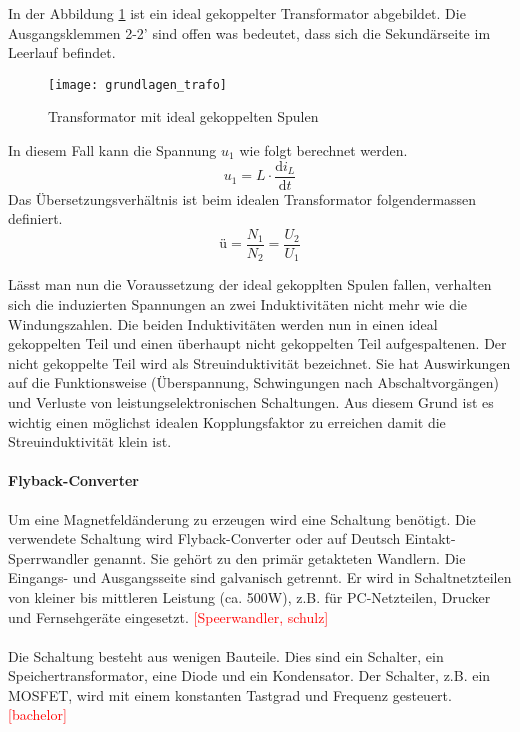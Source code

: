 In der Abbildung \ref{fig:trafo} ist ein ideal gekoppelter Transformator abgebildet. Die Ausgangsklemmen 2-2' sind offen was bedeutet, dass sich die Sekundärseite im Leerlauf befindet. 
\begin{figure}[H]
	\centering
	\texttt{[image: grundlagen\_trafo]}
	\caption{Transformator mit ideal gekoppelten Spulen}\label{fig:trafo}
\end{figure}
In diesem Fall kann die Spannung $ u_{1} $ wie folgt berechnet werden.
\begin{equation}\label{eq:induktionsspannung}
u_{1}=L \cdot \frac{\mathrm{d} i_{L}}{\mathrm{d} t}
\end{equation}
Das Übersetzungsverhältnis ist beim idealen Transformator folgendermassen definiert.
\begin{equation}\label{eq:übertragung}
ü= \frac{N_{1}}{N_{2}} = \frac{U_{2}}{U_{1}}
\end{equation}

Lässt man nun die Voraussetzung der ideal gekopplten Spulen fallen, verhalten sich die induzierten Spannungen an zwei Induktivitäten nicht mehr wie die Windungszahlen. Die beiden Induktivitäten werden nun in einen ideal gekoppelten Teil und einen überhaupt nicht gekoppelten Teil aufgespaltenen. Der nicht gekoppelte Teil wird als Streuinduktivität bezeichnet. Sie hat Auswirkungen auf die Funktionsweise (Überspannung, Schwingungen nach Abschaltvorgängen) und Verluste von leistungselektronischen Schaltungen. Aus diesem Grund ist es wichtig einen möglichst idealen Kopplungsfaktor zu erreichen damit die Streuinduktivität klein ist. 
\newpage

\paragraph{Flyback-Converter}
Um eine Magnetfeldänderung zu erzeugen wird eine Schaltung benötigt. Die verwendete Schaltung wird Flyback-Converter oder auf Deutsch Eintakt-Sperrwandler genannt. Sie gehört zu den primär getakteten Wandlern. Die Eingangs- und Ausgangsseite sind galvanisch getrennt. Er wird in Schaltnetzteilen von kleiner bis mittleren Leistung (ca. 500W), z.B. für PC-Netzteilen, Drucker und Fernsehgeräte eingesetzt. \textcolor{red}{[Speerwandler, schulz]}
\\\\
Die Schaltung besteht aus wenigen Bauteile. Dies sind ein Schalter, ein Speichertransformator, eine Diode und ein Kondensator. Der Schalter, z.B. ein MOSFET, wird mit einem konstanten Tastgrad und Frequenz gesteuert. \textcolor{red}{[bachelor]}

